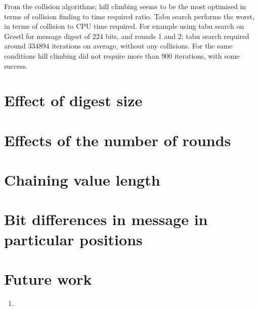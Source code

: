 From the collision algorithms; hill climbing seems to be the most optimised in terms of collision finding to time required
ratio. Tabu search performs the worst, in terms of collision to CPU time required. For example using tabu search on 
Gr{\o}stl for message digest of 224 bits, and rounds 1 and 2; tabu search required around 334894 iterations on average,
without any collisions. For the same conditions hill climbing did not require more than 900 iterations, with some success. 

\section{Effect of digest size}

\section{Effects of the number of rounds}

\section{Chaining value length}

\section{Bit differences in message in particular positions}

\section{Future work}

\begin{enumerate}
\item 
\end{enumerate}
